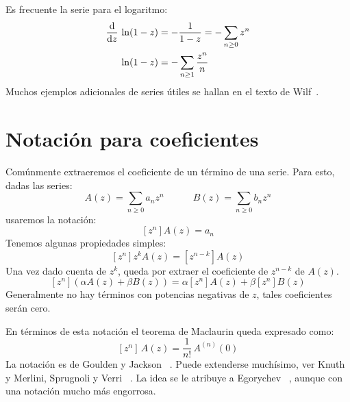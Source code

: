   Es frecuente la serie para el logaritmo:%
  \begin{align}
    \frac{\mathrm{d}}{\mathrm{d} z} \, \ln (1 - z)
      &= - \frac{1}{1 - z}
       = - \sum_{n \ge 0} z^n \notag \\
    \ln (1 - z)
      &= - \sum_{n \ge 1} \frac{z^n}{n}
	   \label{eq:ln(1-z)}
  \end{align}
  Muchos ejemplos adicionales de series útiles
  se hallan en el texto de Wilf~\cite{wilf06:_gfology}.

\section{Notación para coeficientes}
\label{sec:funciones-generatrices:notacion}

  Comúnmente extraeremos el coeficiente de un término de una serie.
  Para esto,
  dadas las series:
  \begin{equation*}
    A(z)
      = \sum_{n \ge 0} a_n z^n
    \hspace{3em}
    B(z)
      = \sum_{n \ge 0} b_n z^n
  \end{equation*}
  usaremos la notación:
  \begin{equation*}
     \left[ z^n \right] A(z) = a_n
  \end{equation*}
  Tenemos algunas propiedades simples:
  \begin{equation*}
    \left[ z^n \right] z^k A(z)
      = \left[ z^{n - k} \right] A(z)
  \end{equation*}
  Una vez dado cuenta de \(z^k\),
  queda por extraer el coeficiente de \(z^{n - k}\) de \(A(z)\).
  \begin{equation*}
    \left[ z^n \right] (\alpha A(z) + \beta B(z))
      = \alpha \left[ z^n \right] A(z)
	  + \beta \left[ z^n \right] B(z)
  \end{equation*}
  Generalmente no hay términos con potencias negativas de \(z\),
  tales coeficientes serán cero.

  En términos de esta notación
  el teorema de Maclaurin%
  queda expresado como:
  \begin{equation*}
    \left[ z^n \right] \, A(z)
      = \frac{1}{n!} \, A^{(n)}(0)
  \end{equation*}
  La notación es de Goulden y Jackson~%
    \cite{goulden04:_combin_enumer}.
  Puede extenderse muchísimo,
  ver Knuth~\cite{knuth94:_brack_notat_coeff_operat}
  y Merlini, Sprugnoli y Verri~%
    \cite{merlini07:_method_coeff}.
  La idea se le atribuye a Egorychev~%
  \cite{egorychev84:_integ_repres_comput_combin_sums},
  aunque con una notación mucho más engorrosa.

